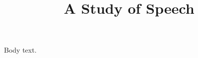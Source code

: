\documentclass{article}
\title{A Study of Speech}
\begin{document}
\maketitle
Body text.
\end{document}
